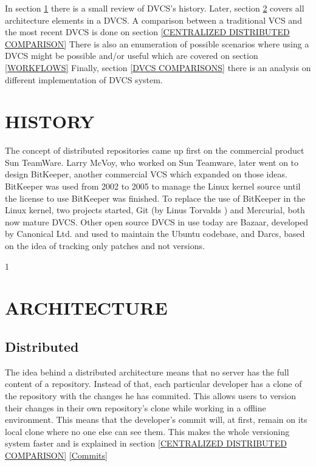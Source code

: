 \documentclass[a4paper,10pt]{article}
\newcommand{\sectionReference}[1]{\hspace{-.25em}\ref{#1}\hspace{.5em}}
\begin{document}
In section \sectionReference{HISTORY} there is a small review of DVCS's history. Later, section
\sectionReference{ARCHITECTURE} covers all architecture elements in a DVCS. A comparison between a traditional VCS 
and the most recent DVCS is done on section \sectionReference{CENTRALIZED DISTRIBUTED COMPARISON} There is also an 
enumeration of possible scenarios where using a DVCS might be possible and/or useful which are covered on section
\sectionReference{WORKFLOWS} Finally, section \sectionReference{DVCS COMPARISONS} there is an analysis on different
implementation of DVCS system.


\section{HISTORY}
\label{HISTORY}

The concept of distributed repositories came up first on the commercial product 
Sun TeamWare. Larry McVoy, who worked on Sun Teamware, later went 
on to design BitKeeper, another commercial VCS which expanded on those ideas. 
BitKeeper was used from 2002 to 2005 to manage the Linux kernel source until 
the license to use BitKeeper was finished. 
To replace the use of BitKeeper in the Linux kernel, two projects started, Git (by
Linus Torvalds \cite{linusgit}) and Mercurial, both now mature DVCS. 
Other open source DVCS in use today are Bazaar, 
developed by Canonical Ltd. and used to maintain the Ubuntu codebase, and Darcs, based on 
the idea of tracking only patches and not versions.


1%
\section{ARCHITECTURE}
\label{ARCHITECTURE}

\subsection{Distributed}
The idea behind a distributed architecture means that no server has the full content of a repository. Instead of that, each 
particular developer has a clone of the repository with the changes he has commited. 
This allows users to version their changes in their own repository's clone while working in a offline environment. This means that the developer's commit
will, at first, remain on its local clone where no one else can see them. This makes the whole versioning system faster and is explained in section \sectionReference{CENTRALIZED DISTRIBUTED COMPARISON}  \sectionReference{Commits} 
\end{document}
